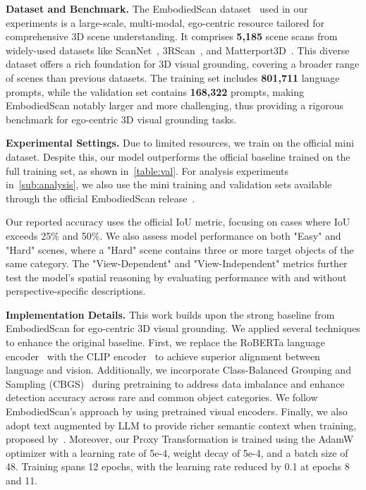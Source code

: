 \noindent\textbf{Dataset and Benchmark.}
The EmbodiedScan dataset~\citep{wang2023embodiedscan} used in our experiments is a large-scale, multi-modal, ego-centric resource tailored for comprehensive 3D scene understanding. It comprises \textbf{5,185} scene scans from widely-used datasets like ScanNet~\citep{dai2017scannet}, 3RScan~\citep{wald2019rio}, and Matterport3D~\citep{chang2017matterport3d}. This diverse dataset offers a rich foundation for 3D visual grounding, covering a broader range of scenes than previous datasets. The training set includes \textbf{801,711} language prompts, while the validation set contains \textbf{168,322} prompts, making EmbodiedScan notably larger and more challenging, thus providing a rigorous benchmark for ego-centric 3D visual grounding tasks.

\noindent\textbf{Experimental Settings.}
Due to limited resources, we train on the official mini dataset. Despite this, our model outperforms the official baseline trained on the full training set, as shown in~\cref{table:val}. For analysis experiments in~\cref{sub:analysis}, we also use the mini training and validation sets available through the official EmbodiedScan release~\citep{wang2023embodiedscan}.

Our reported accuracy uses the official IoU metric, focusing on cases where IoU exceeds 25\% and 50\%. We also assess model performance on both "Easy" and "Hard" scenes, where a "Hard" scene contains three or more target objects of the same category. The "View-Dependent" and "View-Independent" metrics further test the model’s spatial reasoning by evaluating performance with and without perspective-specific descriptions.

\noindent\textbf{Implementation Details.}
This work builds upon the strong baseline from EmbodiedScan for ego-centric 3D visual grounding. We applied several techniques to enhance the original baseline. First, we replace the RoBERTa language encoder~\citep{liu2019robertarobustlyoptimizedbert} with the CLIP encoder~\citep{radford2021learning} to achieve superior alignment between language and vision. Additionally, we incorporate Class-Balanced Grouping and Sampling (CBGS)~\cite{zhu2019class} during pretraining to address data imbalance and enhance detection accuracy across rare and common object categories. We follow EmbodiedScan’s approach by using pretrained visual encoders. Finally, we also adopt text augmented by LLM to provide richer semantic context when training, proposed by~\cite{zhengdenseg}. Moreover, our Proxy Transformation is trained using the AdamW optimizer with a learning rate of 5e-4, weight decay of 5e-4, and a batch size of 48. Training spans 12 epochs, with the learning rate reduced by 0.1 at epochs 8 and 11.


